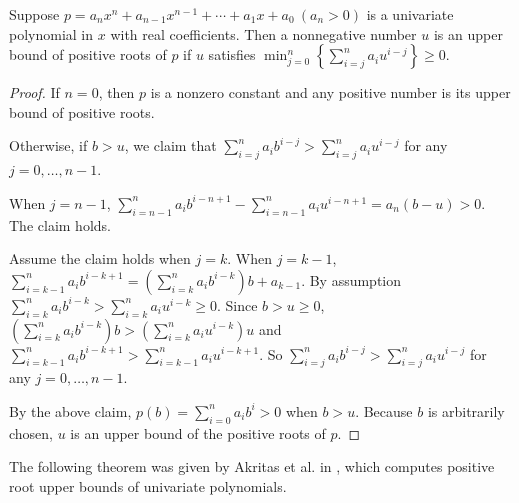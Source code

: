 \begin{theorem} \label{thm:log}
  Suppose   $p=a_nx^n+a_{n-1}x^{n-1}+\cdots+a_1x+a_0\ (a_n>0)$  is a univariate polynomial in $x$ with real coefficients.  Then  a nonnegative number $u$ is an upper bound of positive roots of $p$ if $u$   satisfies $\min_{j=0}^{n}\left\{  \sum_{i=j}^n a_i u^{i-j}\right\}\ge0$.
\end{theorem}
\begin{proof}
  If $n=0$, then $p$ is a nonzero constant and any positive number is its upper bound of positive roots.

  Otherwise, if $b>u$,  we claim that $\sum_{i=j}^na_ib^{i-j}> \sum_{i=j}^na_iu^{i-j}$ for any $j= 0,\ldots,n-1$.

  When $j=n-1$, $\sum_{i=n-1}^na_ib^{i-n+1}-\sum_{i=n-1}^na_iu^{i-n+1}=a_n(b-u)>0.$ The claim holds.

  Assume the claim holds  when $j=k$. When $j=k-1$,  $\sum_{i=k-1}^na_ib^{i-k+1}=\left(\sum_{i=k}^na_ib^{i-k}\right)b+a_{k-1} $. By assumption
  $\sum_{i=k}^na_ib^{i-k}>\sum_{i=k}^na_iu^{i-k}\ge0$. Since $b>u\ge0$, $\left(\sum_{i=k}^na_ib^{i-k}\right)b>\left (\sum_{i=k}^na_iu^{i-k} \right)u  $
  and $\sum_{i=k-1}^na_ib^{i-k+1}> \sum_{i=k-1}^na_iu^{i-k+1}$. So  $\sum_{i=j}^na_ib^{i-j}> \sum_{i=j}^na_iu^{i-j}$ for any $j= 0,\ldots,n-1$.


  By the above claim,   $p(b)=\sum_{i=0}^na_ib^i>0$ when  $b>u$. Because $b$ is arbitrarily chosen, $u$ is an upper bound of the positive roots of $p$.

\end{proof}


The following theorem was given by Akritas et al. in  \cite{akr08}, which computes positive root upper bounds of univariate polynomials.

